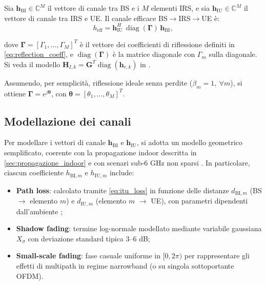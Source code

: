 \documentclass[12pt,a4paper]{report}
\begin{document}
Sia $\mathbf{h}_{\mathrm{BI}} \in \mathbb{C}^{M}$ il vettore di
canale tra BS e i $M$ elementi IRS, e sia $\mathbf{h}_{\mathrm{IU}}
\in \mathbb{C}^{M}$ il vettore di canale tra IRS e UE. Il canale
efficace BS$\to$IRS$\to$UE è:
\begin{equation}
  h_{\mathrm{eff}} = \mathbf{h}_{\mathrm{IU}}^{H}\,
  \operatorname{diag}(\boldsymbol{\Gamma})\, \mathbf{h}_{\mathrm{BI}},
  \label{eq:heff}
\end{equation}

dove $\boldsymbol{\Gamma}=[\Gamma_1,\dots,\Gamma_M]^T$ è il vettore
dei coefficienti di riflessione definiti in
\eqref{eq:reflection_coeff}, e
$\operatorname{diag}(\boldsymbol{\Gamma})$ è la matrice diagonale con
$\Gamma_m$ sulla diagonale. Si veda il modello
$\mathbf{H}_{I,k}=\mathbf{G}^T\operatorname{diag}(\mathbf{h}_{r,k})$
in \cite{guo2021cascaded}.

Assumendo, per semplicità, riflessione ideale senza perdite
($\beta_m=1,\ \forall m$), si ottiene
$\boldsymbol{\Gamma}=e^{j\boldsymbol{\theta}}$, con
$\boldsymbol{\theta}=[\theta_1,\dots,\theta_M]^T$.

\subsection{Modellazione dei canali}
Per modellare i vettori di canale $\mathbf{h}_{\mathrm{BI}}$ e
$\mathbf{h}_{\mathrm{IU}}$, si adotta un modello geometrico
semplificato, coerente con la propagazione indoor descritta in
\cref{sec:propagazione_indoor} e con scenari sub-6 GHz non sparsi
\cite{guo2021cascaded}. In particolare, ciascun coefficiente
$h_{\mathrm{BI},m}$ e $h_{\mathrm{IU},m}$ include:

\begin{itemize}
  \item \textbf{Path loss}: calcolato tramite \eqref{eq:itu_loss} in
    funzione delle distanze $d_{\mathrm{BI},m}$ (BS $\rightarrow$
    elemento $m$) e $d_{\mathrm{IU},m}$ (elemento $m$ $\rightarrow$
    UE), con parametri dipendenti dall'ambiente \cite{itu_p1238_2025};
  \item \textbf{Shadow fading}: termine log-normale modellato
    mediante variabile gaussiana $X_\sigma$ con deviazione standard
    tipica 3--6 dB;
  \item \textbf{Small-scale fading}: fase casuale uniforme in
    $[0,2\pi)$ per rappresentare gli effetti di multipath in regime
    narrowband (o su singola sottoportante OFDM).
\end{itemize}
\end{document}
